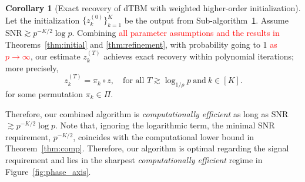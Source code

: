 \documentclass[lettersize,onecolumn,journal]{IEEEtran}
\theoremstyle{definition}
\newtheorem{cor}{Corollary}
\theoremstyle{definition}
\newtheorem{defn}{Definition}
\begin{document}
{\begin{cor}[Exact recovery of dTBM with weighted higher-order initialization]  Let the initialization $\{z^{(0)}_k\}_{k = 1}^K$ be the output from Sub-algorithm~\hyperref[alg:main]{1}. Assume $\text{SNR} \gtrsim p^{-K/2} \log p$. Combining \textcolor{red}{all parameter assumptions and the results in} Theorems~\ref{thm:initial} and \ref{thm:refinement}, with probability going to 1 \textcolor{red}{as $p \rightarrow \infty$}, our estimate $z^{(T)}_k$ achieves exact recovery within polynomial iterations; more precisely,
\begin{equation}
     z^{(T)}_k = \pi_k \circ z, \quad \text{for all }T\gtrsim \log_{1/\rho} p\  \text{and}\ k \in [K ].
\end{equation}
for some permutation $\pi_k \in \Pi$. 
\end{cor}
Therefore, our combined algorithm is \textit{computationally efficient} as long as SNR $\gtrsim p^{-K/2} \log p$. Note that, ignoring the logarithmic term, the minimal SNR requirement, $p^{-K/2}$, coincides with the computational lower bound in Theorem~\ref{thm:comp}. Therefore, our algorithm is optimal regarding the signal requirement and lies in the sharpest \emph{computationally efficient} regime in Figure~\ref{fig:phase_axis}. 


}



\end{document}
